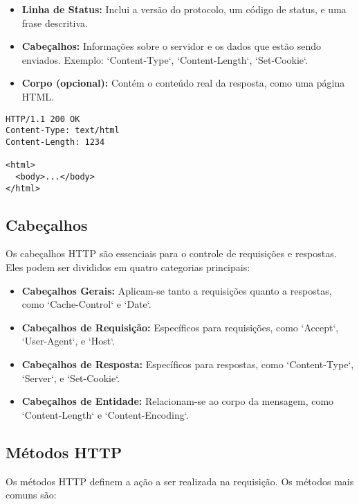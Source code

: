 \begin{itemize}
    \item \textbf{Linha de Status:} Inclui a versão do protocolo, um código de status, e uma frase descritiva.
    \item \textbf{Cabeçalhos:} Informações sobre o servidor e os dados que estão sendo enviados. Exemplo: `Content-Type`, `Content-Length`, `Set-Cookie`.
    \item \textbf{Corpo (opcional):} Contém o conteúdo real da resposta, como uma página HTML.
\end{itemize}

\begin{verbatim}
HTTP/1.1 200 OK
Content-Type: text/html
Content-Length: 1234

<html>
  <body>...</body>
</html>
\end{verbatim}

\subsection{Cabeçalhos}
Os cabeçalhos HTTP são essenciais para o controle de requisições e respostas. Eles podem ser divididos em quatro categorias principais:

\begin{itemize}
    \item \textbf{Cabeçalhos Gerais:} Aplicam-se tanto a requisições quanto a respostas, como `Cache-Control` e `Date`.
    \item \textbf{Cabeçalhos de Requisição:} Específicos para requisições, como `Accept`, `User-Agent`, e `Host`.
    \item \textbf{Cabeçalhos de Resposta:} Específicos para respostas, como `Content-Type`, `Server`, e `Set-Cookie`.
    \item \textbf{Cabeçalhos de Entidade:} Relacionam-se ao corpo da mensagem, como `Content-Length` e `Content-Encoding`.
\end{itemize}


\subsection{Métodos HTTP}
Os métodos HTTP definem a ação a ser realizada na requisição. Os métodos mais comuns são:

